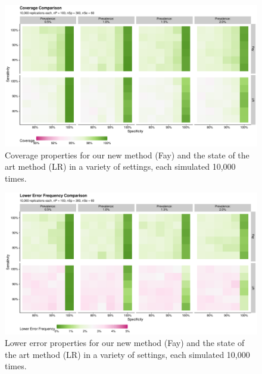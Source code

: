 \documentclass[AMA,STIX1COL]{WileyNJD-v2}
\begin{document}
\begin{figure}
    \centering
    \includegraphics[width=\textwidth]{figures/coverage_comparison_plot}
    \caption{Coverage properties for our new method (Fay) and the state of the art method (LR) in a variety of settings, each simulated 10,000 times.}
    \label{fig:coverage_comparison_plot}
\end{figure}

\begin{figure}
    \centering
    \includegraphics[width=\textwidth]{figures/lower_error_frequency_comparison_plot}
    \caption{Lower error properties for our new method (Fay) and the state of the art method (LR) in a variety of settings, each simulated 10,000 times.}
    \label{fig:lower_error_frequency_comparison_plot}
\end{figure}
\end{document}
